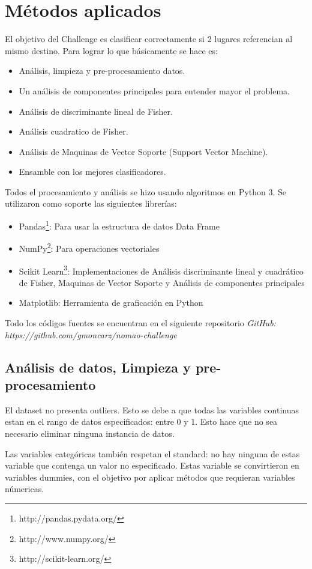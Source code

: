 \documentclass[journal]{IEEEtran}
\begin{document}
\section{Métodos aplicados}

El objetivo del Challenge es clasificar correctamente si 2 lugares
referencian al mismo destino. Para lograr lo que básicamente se hace es:
\begin{itemize}
\item Análisis, limpieza y pre-procesamiento datos. 
\item Un análisis de componentes principales para entender mayor el problema. 
\item Análisis de discriminante lineal de Fisher.
\item Análisis cuadratico de Fisher.
\item Análisis de Maquinas de Vector Soporte (Support Vector Machine).
\item Ensamble con los mejores clasificadores.
\end{itemize}

Todos el procesamiento y análisis se hizo usando algoritmos en Python 3. Se
utilizaron como soporte las siguientes librerías:
\begin{itemize}
\item Pandas\footnote{http://pandas.pydata.org/}: Para usar la estructura de datos Data Frame
\item NumPy\footnote{http://www.numpy.org/}: Para operaciones vectoriales
\item Scikit Learn\footnote{http://scikit-learn.org/}: Implementaciones de Análisis discriminante lineal
	y cuadrático de Fisher, Maquinas de Vector Soporte y Análisis
	de componentes principales
\item Matplotlib: Herramienta de graficación en Python
\end{itemize}

Todo los códigos fuentes se encuentran en el siguiente repositorio
\textit{GitHub: https://github.com/gmoncarz/nomao-challenge}

\subsection{Análisis de datos, Limpieza y pre-procesamiento}
El dataset no presenta outliers. Esto se debe a que todas las variables continuas estan
en el rango de datos especificados: entre 0 y 1. 
Esto hace que no sea necesario eliminar ninguna
instancia de datos.

Las variables categóricas también respetan el standard: no hay ninguna
de estas variable que contenga un valor no especificado. Estas 
variable se convirtieron en variables dummies, con el objetivo 
por aplicar métodos que requieran variables númericas.
\end{document}
